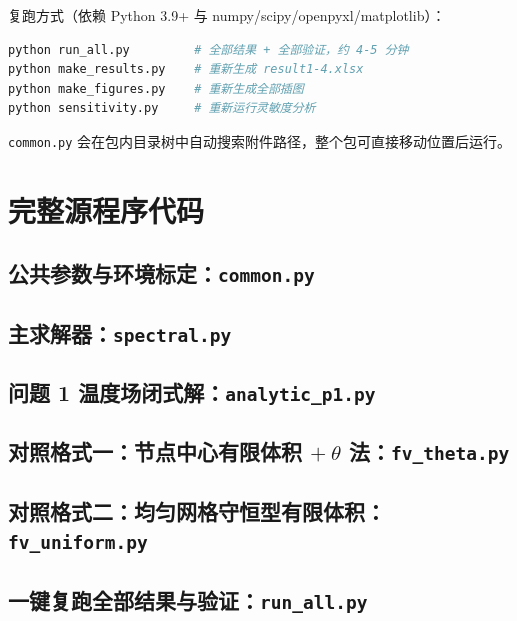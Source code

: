\documentclass[bwprint]{cumcmthesis}
\begin{document}
复跑方式（依赖 Python 3.9+ 与 numpy/scipy/openpyxl/matplotlib）：
\begin{lstlisting}[language=bash]
python run_all.py         # 全部结果 + 全部验证，约 4-5 分钟
python make_results.py    # 重新生成 result1-4.xlsx
python make_figures.py    # 重新生成全部插图
python sensitivity.py     # 重新运行灵敏度分析
\end{lstlisting}
\texttt{common.py} 会在包内目录树中自动搜索附件路径，整个包可直接移动位置后运行。

\section{完整源程序代码}

\subsection{公共参数与环境标定：\texttt{common.py}}


\subsection{主求解器：\texttt{spectral.py}}


\subsection{问题 1 温度场闭式解：\texttt{analytic\_p1.py}}


\subsection{对照格式一：节点中心有限体积 $+\ \theta$ 法：\texttt{fv\_theta.py}}


\subsection{对照格式二：均匀网格守恒型有限体积：\texttt{fv\_uniform.py}}


\subsection{一键复跑全部结果与验证：\texttt{run\_all.py}}

\end{document}
